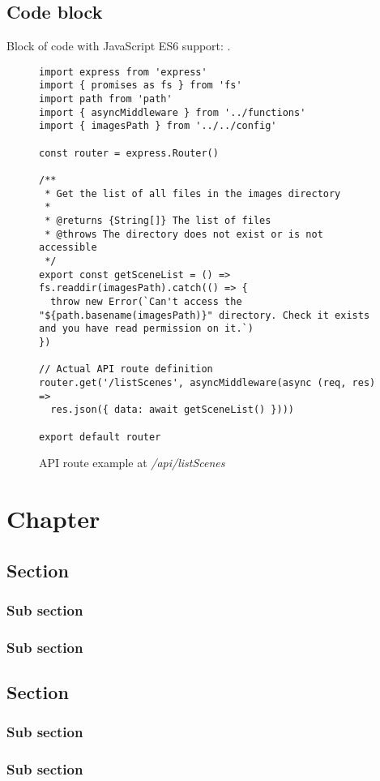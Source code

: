 \section{Code block}
\noindent
Block of code with JavaScript ES6 support: .

\begin{figure}[hbt!]
\begin{lstlisting}[style=ES6]
import express from 'express'
import { promises as fs } from 'fs'
import path from 'path'
import { asyncMiddleware } from '../functions'
import { imagesPath } from '../../config'

const router = express.Router()

/**
 * Get the list of all files in the images directory
 *
 * @returns {String[]} The list of files
 * @throws The directory does not exist or is not accessible
 */
export const getSceneList = () => fs.readdir(imagesPath).catch(() => {
  throw new Error(`Can't access the "${path.basename(imagesPath)}" directory. Check it exists and you have read permission on it.`)
})

// Actual API route definition
router.get('/listScenes', asyncMiddleware(async (req, res) =>
  res.json({ data: await getSceneList() })))

export default router
\end{lstlisting}
\caption{API route example at \emph{/api/listScenes}}
\label{fig:es6-route-api}
\end{figure}


\chapter{Chapter}
\section{Section}
\subsection{Sub section}
\subsection{Sub section}
\section{Section}
\subsection{Sub section}
\subsection{Sub section}


\printglossaries


